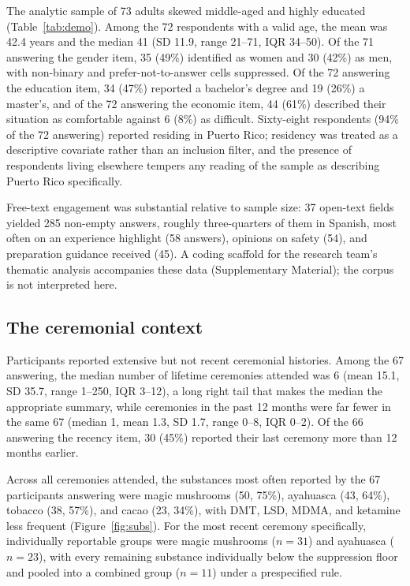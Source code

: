 \documentclass[12pt]{article}
\begin{document}
The analytic sample of 73 adults skewed middle-aged and highly educated (Table~\ref{tab:demo}). Among the
72 respondents with a valid age, the mean was 42.4 years and the median 41 (SD 11.9, range 21--71, IQR
34--50). Of the 71 answering the gender item, 35 (49\%) identified as women and 30 (42\%) as men, with
non-binary and prefer-not-to-answer cells suppressed. Of the 72 answering the education item, 34 (47\%)
reported a bachelor's degree and 19 (26\%) a master's, and of the 72 answering the economic item, 44
(61\%) described their situation as comfortable against 6 (8\%) as difficult. Sixty-eight respondents
(94\% of the 72 answering) reported residing in Puerto Rico; residency was treated as a descriptive
covariate rather than an inclusion filter, and the presence of respondents living elsewhere tempers any
reading of the sample as describing Puerto Rico specifically.

Free-text engagement was substantial relative to sample size: 37 open-text fields yielded 285 non-empty
answers, roughly three-quarters of them in Spanish, most often on an experience highlight (58 answers),
opinions on safety (54), and preparation guidance received (45). A coding scaffold for the research team's
thematic analysis accompanies these data (Supplementary Material); the corpus is not interpreted here.

\subsection{The ceremonial context}

Participants reported extensive but not recent ceremonial histories. Among the 67 answering, the median
number of lifetime ceremonies attended was 6 (mean 15.1, SD 35.7, range 1--250, IQR 3--12), a long right
tail that makes the median the appropriate summary, while ceremonies in the past 12 months were far fewer
in the same 67 (median 1, mean 1.3, SD 1.7, range 0--8, IQR 0--2). Of the 66 answering the recency item, 30
(45\%) reported their last ceremony more than 12 months earlier.

Across all ceremonies attended, the substances most often reported by the 67 participants answering were
magic mushrooms (50, 75\%), ayahuasca (43, 64\%), tobacco (38, 57\%), and cacao (23, 34\%), with DMT, LSD,
MDMA, and ketamine less frequent (Figure~\ref{fig:subs}). For the most recent ceremony specifically,
individually reportable groups were magic mushrooms ($n=31$) and ayahuasca ($n=23$), with every remaining
substance individually below the suppression floor and pooled into a combined group ($n=11$) under a
prespecified rule.
\end{document}
